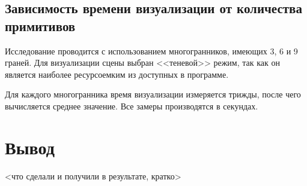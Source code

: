 \subsection{Зависимость времени визуализации от количества примитивов}

Исследование проводится с использованием многогранников, имеющих 3, 6 и 9 граней. Для визуализации сцены выбран <<теневой>> режим, так как он является наиболее ресурсоемким из доступных в программе.

Для каждого многогранника время визуализации измеряется трижды, после чего вычисляется среднее значение. Все замеры производятся в секундах.

\section{Вывод}

<что сделали и получили в результате, кратко>

\clearpage

